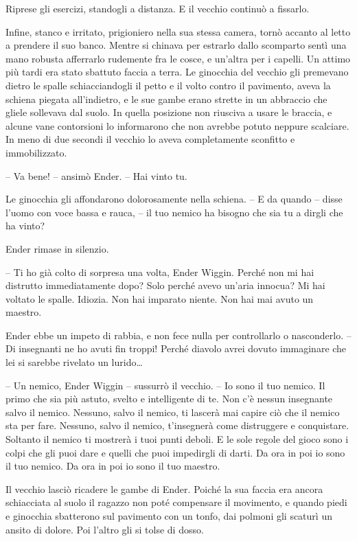 {Riprese gli esercizi, standogli a distanza. E il vecchio continuò a
	fissarlo.}

{Infine, stanco e irritato, prigioniero nella sua stessa camera, tornò
	accanto al letto a prendere il suo banco. Mentre si chinava per estrarlo
	dallo scomparto sentì una mano robusta afferrarlo rudemente fra le
	cosce, e un'altra per i capelli. Un attimo più tardi era stato sbattuto
	faccia a terra. Le ginocchia del vecchio gli premevano dietro le spalle
	schiacciandogli il petto e il volto contro il pavimento, aveva la
	schiena piegata all'indietro, e le sue gambe erano strette in un
	abbraccio che gliele sollevava dal suolo. In quella posizione non
	riusciva a usare le braccia, e alcune vane contorsioni lo informarono
	che non avrebbe potuto neppure scalciare. In meno di due secondi il
	vecchio lo aveva completamente sconfitto e immobilizzato.}

{-- Va bene! -- ansimò Ender. -- Hai vinto tu.}

{Le ginocchia gli affondarono dolorosamente nella schiena. -- E da
	quando -- disse l'uomo con voce bassa e rauca, -- il tuo nemico ha
	bisogno che sia tu a dirgli che ha vinto?}

{Ender rimase in silenzio.}

{-- Ti ho già colto di sorpresa una volta, Ender Wiggin. Perché non mi
	hai distrutto immediatamente dopo? Solo perché avevo un'aria innocua? Mi
	hai voltato le spalle. Idiozia. Non hai imparato niente. Non hai mai
	avuto un maestro.}

{Ender ebbe un impeto di rabbia, e non fece nulla per controllarlo o
	nasconderlo. -- Di insegnanti ne ho avuti fin troppi! Perché diavolo
	avrei dovuto immaginare che lei si sarebbe rivelato un lurido\ldots{}}

{-- Un nemico, Ender Wiggin -- sussurrò il vecchio. -- Io sono il tuo
	nemico. Il primo che sia più astuto, svelto e intelligente di te. Non
	c'è nessun insegnante salvo il nemico. Nessuno, salvo il nemico, ti
	lascerà mai capire ciò che il nemico sta per fare. Nessuno, salvo il
	nemico, t'insegnerà come distruggere e conquistare. Soltanto il nemico
	ti mostrerà i tuoi punti deboli. E le sole regole del gioco sono i colpi
	che gli puoi dare e quelli che puoi impedirgli di darti. Da ora in poi
	io sono il tuo nemico. Da ora in poi io sono il tuo maestro.}

{Il vecchio lasciò ricadere le gambe di Ender. Poiché la sua faccia era
	ancora schiacciata al suolo il ragazzo non poté compensare il movimento,
	e quando piedi e ginocchia sbatterono sul pavimento con un tonfo, dai
	polmoni gli scaturì un ansito di dolore. Poi l'altro gli si tolse di
	dosso.}

